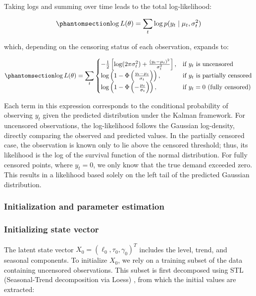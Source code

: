 \documentclass[
  authoryear,
  doubleblind,
  3p]{elsarticle}
\begin{document}
Taking logs and summing over time leads to the total log-likelihood:

\begin{equation}\phantomsection\label{eq-wp2_a4}{
\log L(\theta) = \sum_t \log p(y_t \mid \mu_t, \sigma_t^2)
}\end{equation}

which, depending on the censoring status of each observation, expands
to:

\begin{equation}\phantomsection\label{eq-wp2_a5}{
\log L(\theta) = \sum_t
\begin{cases}
-\frac{1}{2} \left[ \log(2\pi \sigma_t^2) + \frac{(y_t - \mu_t)^2}{\sigma_t^2} \right], & \text{if } y_t \text{ is uncensored} \\
\log\left(1 - \Phi\left(\frac{y_t - \mu_t}{\sigma_t}\right)\right), & \text{if } y_t \text{ is partially censored} \\
\log\left(1 - \Phi\left(-\frac{\mu_t}{\sigma_t}\right)\right), & \text{if } y_t = 0 \text{ (fully censored)}
\end{cases}
}\end{equation}

Each term in this expression corresponds to the conditional probability
of observing \(y_t\) given the predicted distribution under the Kalman
framework. For uncensored observations, the log-likelihood follows the
Gaussian log-density, directly comparing the observed and predicted
values. In the partially censored case, the observation is known only to
lie above the censored threshold; thus, its likelihood is the log of the
survival function of the normal distribution. For fully censored points,
where \(y_t = 0\), we only know that the true demand exceeded zero. This
results in a likelihood based solely on the left tail of the predicted
Gaussian distribution.

\subsubsection{Initialization and parameter
estimation}\label{initialization-and-parameter-estimation}

\subsubsection{Initializing state
vector}\label{initializing-state-vector}

The latent state vector \(X_0 = (\ell_0, \tau_0, \gamma_0)^T\) includes
the level, trend, and seasonal components. To initialize \(X_0\), we
rely on a training subset of the data containing uncensored
observations. This subset is first decomposed using STL (Seasonal-Trend
decomposition via Loess) \citep{cleveland1990}, from which the initial
values are extracted:
\end{document}
